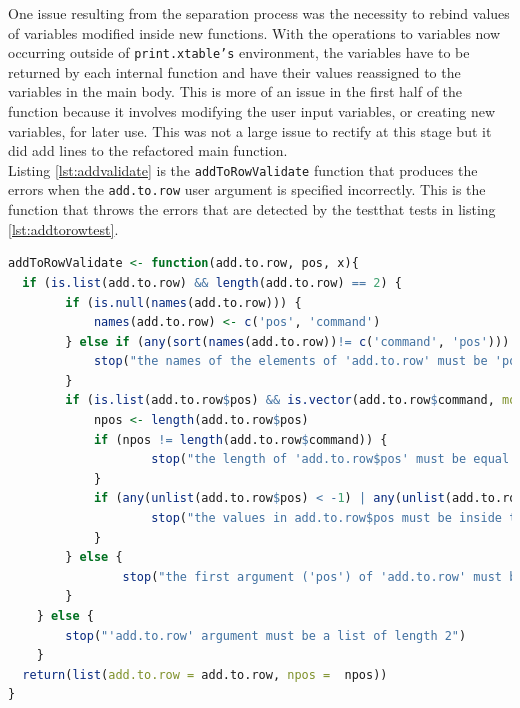 \documentclass{memoir}\usepackage[]{graphicx}\usepackage[]{color}
\newcommand{\pkg}[1]{{\fontseries{b}\selectfont #1}}
\let\code=\texttt
\begin{document}
One issue resulting from the separation process was the necessity to rebind values of variables modified inside new functions. With the operations to variables now occurring outside of \code{print.xtable's} environment, the variables have to be returned by each internal function and have their values reassigned to the variables in the main body. This is more of an issue in the first half of the function because it involves modifying the user input variables, or creating new variables, for later use. This was not a large issue to rectify at this stage but it did add lines to the refactored main function.\\

Listing \ref{lst:addvalidate} is the \code{addToRowValidate} function that produces the errors when the \code{add.to.row} user argument is specified incorrectly. This is the function that throws the errors that are detected by the \pkg{testthat} tests in listing \ref{lst:addtorowtest}. 

\vspace{4mm}

\begin{minipage}{\linewidth}
\begin{lstlisting}[caption={add to row validation},label={lst:addvalidate},language=R]
addToRowValidate <- function(add.to.row, pos, x){
  if (is.list(add.to.row) && length(add.to.row) == 2) {
        if (is.null(names(add.to.row))) {
            names(add.to.row) <- c('pos', 'command')
        } else if (any(sort(names(add.to.row))!= c('command', 'pos'))) {
            stop("the names of the elements of 'add.to.row' must be 'pos' and 'command'")
        }
        if (is.list(add.to.row$pos) && is.vector(add.to.row$command, mode = 'character')) {
            npos <- length(add.to.row$pos)
            if (npos != length(add.to.row$command)) {
                    stop("the length of 'add.to.row$pos' must be equal to the length of 'add.to.row$command'")
            }
            if (any(unlist(add.to.row$pos) < -1) | any(unlist(add.to.row$pos) > nrow(x))) {
                    stop("the values in add.to.row$pos must be inside the interval [-1, nrow(x)]") 
            }
        } else {
                stop("the first argument ('pos') of 'add.to.row' must be a list, the second argument ('command') must be a vector of mode character")
        }
    } else {
        stop("'add.to.row' argument must be a list of length 2")
    }
  return(list(add.to.row = add.to.row, npos =  npos))
}
\end{lstlisting}
\end{minipage}
\end{document}
